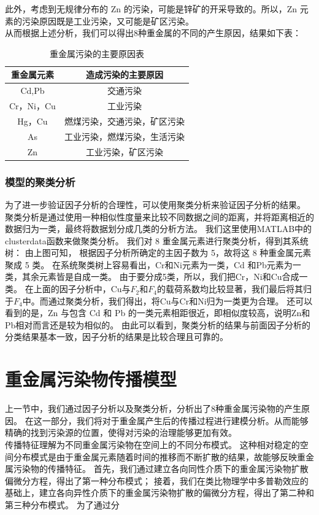 \documentclass[a4paper]{article}
\begin{document}
此外，考虑到无规律分布的 Zn 的污染，可能是锌矿的开采导致的。所以，Zn 元素的污染原因既是工业污染，又可能是矿区污染。\\
\indent 从而根据上述分析，我们可以得出8种重金属的不同的产生原因，结果如下表：
\begin{table}[H]
		\centering
		\caption{重金属污染的主要原因表}
		\label{main-reason}
		\begin{tabular}{|c|c|}
		\hline
			重金属元素	  &  造成污染的主要原因 \\
			\hline
			Cd,Pb  &    交通污染  \\  \hline
			Cr，Ni，Cu  &    工业污染 \\ \hline
			Hg，Cu   &   燃煤污染，交通污染，矿区污染 \\ \hline
			As   &	工业污染，燃煤污染，生活污染  \\ \hline
			Zn  &     工业污染，矿区污染        \\ \hline
		\end{tabular}
\end{table}
\section{模型的聚类分析}
为了进一步验证因子分析的合理性，可以使用聚类分析来验证因子分析的结果。
聚类分析是通过使用一种相似性度量来比较不同数据之间的距离，并将距离相近的数据归为一类，最终将数据划分成几类的分析方法。
我们这里使用MATLAB中的clusterdata函数来做聚类分析。
我们对 8 重金属元素进行聚类分析，得到其系统树：
由上图可知， 根据因子分析所确定的主因子数为 5，故将这 8 种重金属元素聚成 5 类。
在系统聚类树上容易看出，Cr和Ni元素为一类，Cd 和Pb元素为一类，其余元素皆是自成一类。
由于要分成5类，所以，我们把Cr，Ni和Cu合成一类。
在上面的因子分析中，Cu与$F_2$和$F_4$的载荷系数均比较显著，我们最后将其归于$F_4$中。而通过聚类分析，我们得出，将Cu与Cr和Ni归为一类更为合理。
还可以看到的是，Zn 与包含 Cd 和 Pb 的一类元素相距很近，即相似度较高，说明Zn和Pb相对而言还是较为相似的。
由此可以看到，聚类分析的结果与前面因子分析的分类结果基本一致，因子分析的结果是比较合理且可靠的。

\part{重金属污染物传播模型}
上一节中，我们通过因子分析以及聚类分析，分析出了8种重金属污染物的产生原因。
在这一部分，我们将对于重金属产生后的传播过程进行建模分析。从而能够精确的找到污染源的位置，使得对污染的治理能够更加有效。\\
\indent 传播特征理解为不同重金属污染物在空间上的不同分布模式。
这种相对稳定的空间分布模式是由于重金属元素随着时间的推移而不断扩散的结果，故能够反映重金属污染物的传播特征。
首先，我们通过建立各向同性介质下的重金属污染物扩散偏微分方程，得出了第一种分布模式；
接着，我们在类比物理学中多普勒效应的基础上，建立各向异性介质下的重金属污染物扩散的偏微分方程，得出了第二种和第三种分布模式。
为了通过分
\end{document}
